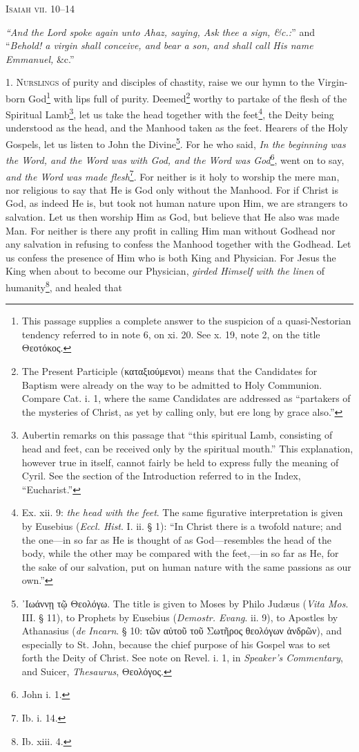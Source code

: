 
\textsc{Isaiah vii. 10–14}

\emph{“And the Lord spoke again unto Ahaz, saying, Ask thee a sign, \&c.:}” and “\emph{Behold! a virgin shall conceive, and bear a son, and shall call His name Emmanuel,} \&c.”

1. \textsc{Nurslings} of purity and disciples of chastity, raise we our hymn to the Virgin-born God\footnote{This passage supplies a complete answer to the suspicion of a quasi-Nestorian tendency referred to in note 6, on xi. 20. See x. 19, note 2, on the title \textgreek{Θεοτόκος}.} with lips full of purity. Deemed\footnote{The Present Participle (\textgreek{καταξιούμενοι}) means that the Candidates for Baptism were already on the way to be admitted to Holy Communion. Compare Cat. i. 1, where the same Candidates are addressed as “partakers of the mysteries of Christ, as yet by calling only, but ere long by grace also.”} worthy to partake of the flesh of the Spiritual Lamb\footnote{Aubertin remarks on this passage that “this spiritual Lamb, consisting of head and feet, can be received only by the spiritual mouth.” This explanation, however true in itself, cannot fairly be held to express fully the meaning of Cyril. See the section of the Introduction referred to in the Index, “Eucharist.”}, let us take the head together with the feet\footnote{Ex. xii. 9: \emph{the head with the feet}. The same figurative interpretation is given by Eusebius (\emph{Eccl. Hist}. I. ii. § 1): “In Christ there is a twofold nature; and the one—in so far as He is thought of as God—resembles the head of the body, while the other may be compared with the feet,—in so far as He, for the sake of our salvation, put on human nature with the same passions as our own.”}, the Deity being understood as the head, and the Manhood taken as the feet. Hearers of the Holy Gospels, let us listen to John the Divine\footnote{\textgreek{᾽Ιωάννῃ τῷ Θεολόγω}. The title is given to Moses by Philo Judæus (\emph{Vita Mos}. III. § 11), to Prophets by Eusebius (\emph{Demostr. Evang}. ii. 9), to Apostles by Athanasius (\emph{de Incarn}. § 10: \textgreek{τῶν αὐτοῦ τοῦ Σωτῆρος θεολόγων ἀνδρῶν}), and especially to St. John, because the chief purpose of his Gospel was to set forth the Deity of Christ. See note on Revel. i. 1, in \emph{Speaker’s Commentary}, and Suicer, \emph{Thesaurus}, \textgreek{Θεολόγος}.}. For he who said, \emph{In the beginning was the Word, and the Word was with God, and the Word was God}\footnote{John i. 1.}, went on to say, \emph{and the Word was made flesh}\footnote{Ib. i. 14.}. For neither is it holy to worship the mere man, nor religious to say that He is God only without the Manhood. For if Christ is God, as indeed He is, but took not human nature upon Him, we are strangers to salvation. Let us then worship Him as God, but believe that He also was made Man. For neither is there any profit in calling Him man without Godhead nor any salvation in refusing to confess the Manhood together with the Godhead. Let us confess the presence of Him who is both King and Physician. For Jesus the King when about to become our Physician, \emph{girded Himself with the linen} of humanity\footnote{Ib. xiii. 4.}, and healed that 